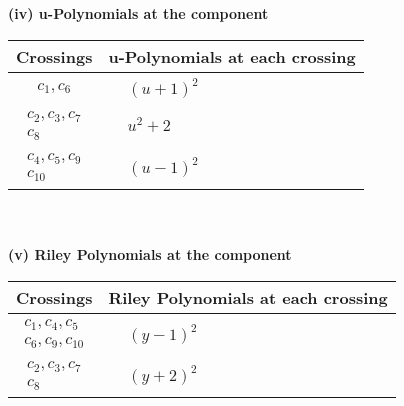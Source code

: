 \documentclass[1p]{elsarticle_modified}
\theoremstyle{definition}
\begin{document}
\newpage\renewcommand{\arraystretch}{1}
\flushleft \textbf{(iv) u-Polynomials at the component}\newline \\
\begin{tabular}{m{50pt}|m{274pt}}
Crossings & \hspace{64pt}u-Polynomials at each crossing \\
\hline $$\begin{aligned}c_{1},c_{6}\end{aligned}$$&$\begin{aligned}
&(u+1)^2
\end{aligned}$\\
\hline $$\begin{aligned}c_{2},c_{3},c_{7}\\c_{8}\end{aligned}$$&$\begin{aligned}
&u^2+2
\end{aligned}$\\
\hline $$\begin{aligned}c_{4},c_{5},c_{9}\\c_{10}\end{aligned}$$&$\begin{aligned}
&(u-1)^2
\end{aligned}$\\
\hline
\end{tabular}\\~\\
\newpage\renewcommand{\arraystretch}{1}
\flushleft \textbf{(v) Riley Polynomials at the component}\newline \\
\begin{tabular}{m{50pt}|m{274pt}}
Crossings & \hspace{64pt}Riley Polynomials at each crossing \\
\hline $$\begin{aligned}c_{1},c_{4},c_{5}\\c_{6},c_{9},c_{10}\end{aligned}$$&$\begin{aligned}
&(y-1)^2
\end{aligned}$\\
\hline $$\begin{aligned}c_{2},c_{3},c_{7}\\c_{8}\end{aligned}$$&$\begin{aligned}
&(y+2)^2
\end{aligned}$\\
\hline
\end{tabular}\\~\\
\end{document}
